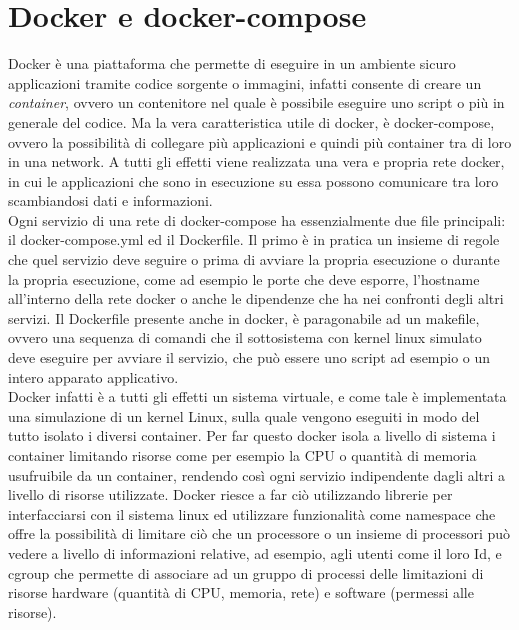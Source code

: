 \documentclass[a4paper,titlepage,12pt]{report}
\begin{document}
{\section{
Docker e docker-compose}
Docker è una piattaforma che permette di eseguire in un ambiente sicuro applicazioni tramite codice sorgente o immagini, infatti consente di creare un \textit{container}, ovvero un contenitore nel quale è possibile eseguire uno script o più in generale del codice. Ma la vera caratteristica utile di docker, è docker-compose, ovvero la possibilità di collegare più applicazioni e quindi più container tra di loro in una network. A tutti gli effetti viene realizzata una vera e propria rete docker, in cui le applicazioni che sono in esecuzione su essa possono comunicare tra loro scambiandosi dati e informazioni.\\
Ogni servizio di una rete di docker-compose ha essenzialmente due file principali: il docker-compose.yml ed il Dockerfile. Il primo è in pratica un insieme di regole che quel servizio deve seguire o prima di avviare la propria esecuzione o durante la propria esecuzione, come ad esempio le porte che deve esporre, l'hostname all'interno della rete docker o anche le dipendenze che ha nei confronti degli altri servizi. Il Dockerfile presente anche in docker, è paragonabile ad un makefile, ovvero una sequenza di comandi che il sottosistema con kernel linux simulato deve eseguire per avviare il servizio, che può essere uno script ad esempio o un intero apparato applicativo.\\
Docker infatti è a tutti gli effetti un sistema virtuale, e come tale è implementata una simulazione di un kernel Linux, sulla quale vengono eseguiti in modo del tutto isolato i diversi container.
Per far questo docker isola a livello di sistema i container limitando risorse come per esempio la CPU o quantità di memoria usufruibile da un container, rendendo così ogni servizio indipendente dagli altri a livello di risorse utilizzate. Docker riesce a far ciò utilizzando librerie per interfacciarsi con il sistema linux ed utilizzare funzionalità come namespace che offre la possibilità di limitare ciò che un processore o un insieme di processori può vedere a livello di informazioni relative, ad esempio, agli utenti come il loro Id, e cgroup che permette di associare ad un gruppo di processi delle limitazioni di risorse hardware (quantità di CPU, memoria, rete) e software (permessi alle risorse).


}
\end{document}
